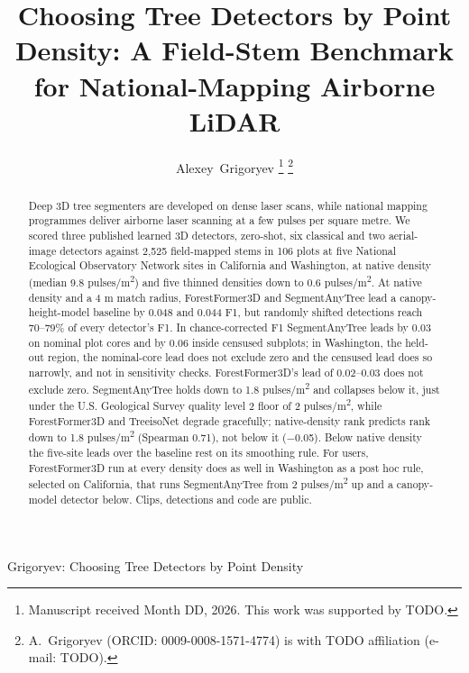\documentclass[journal]{IEEEtran}
\begin{document}

\title{Choosing Tree Detectors by Point Density: A Field-Stem Benchmark for National-Mapping Airborne LiDAR}

\author{Alexey~Grigoryev%
\thanks{Manuscript received Month DD, 2026. %
This work was supported by TODO. %
}%
\thanks{A.~Grigoryev (ORCID: 0009-0008-1571-4774) is with TODO affiliation (e-mail: TODO). %
}}

%
{Grigoryev: Choosing Tree Detectors by Point Density}

\maketitle

\begin{abstract}
Deep 3D tree segmenters are developed on dense laser scans, while national
mapping programmes deliver airborne laser scanning at a few pulses per square
metre. We scored three published learned 3D detectors, zero-shot, six classical
and two aerial-image detectors against 2,525 field-mapped stems in 106 plots at
five National Ecological Observatory Network sites in California and Washington,
at native density (median 9.8 pulses/m\textsuperscript{2}) and five thinned densities down to 0.6
pulses/m\textsuperscript{2}. At native density and a 4 m match radius, ForestFormer3D and
SegmentAnyTree lead a canopy-height-model baseline by 0.048 and 0.044 F1, but
randomly shifted detections reach 70--79\% of every detector's F1. In
chance-corrected F1 SegmentAnyTree leads by 0.03 on nominal plot cores and by
0.06 inside censused subplots; in Washington, the held-out region, the
nominal-core lead does not exclude zero and the censused lead does so narrowly,
and not in sensitivity checks. ForestFormer3D's lead of 0.02--0.03 does not
exclude zero. SegmentAnyTree holds down to 1.8 pulses/m\textsuperscript{2} and
collapses below it, just under the U.S. Geological Survey quality level 2 floor
of 2 pulses/m\textsuperscript{2}, while ForestFormer3D and TreeisoNet degrade gracefully;
native-density rank predicts rank down to 1.8 pulses/m\textsuperscript{2} (Spearman 0.71), not
below it ($-$0.05). Below native density the five-site leads over the baseline
rest on its smoothing rule. For users, ForestFormer3D run at every density does
as well in Washington as a post hoc rule, selected on California, that runs
SegmentAnyTree from 2 pulses/m\textsuperscript{2} up and a canopy-model detector below. Clips,
detections and code are public.
\end{abstract}
\end{document}
